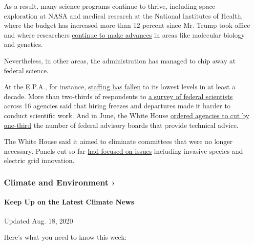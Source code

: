 As a result, many science programs continue to thrive, including space
exploration at NASA and medical research at the National Institutes of
Health, where the budget has increased more than 12 percent since Mr.
Trump took office and where researchers
\href{https://www.nytimes3xbfgragh.onion/2018/01/06/us/politics/congress-medical-research-health-care.html}{continue
to make advances} in areas like molecular biology and genetics.

Nevertheless, in other areas, the administration has managed to chip
away at federal science.

At the E.P.A., for instance,
\href{https://fas.org/sgp/crs/misc/IF11153.pdf}{staffing has fallen} to
its lowest levels in at least a decade. More than two-thirds of
respondents to
\href{https://www.ucsusa.org/sites/default/files/attach/2018/08/science-under-trump-report.pdf}{a
survey of federal scientists} across 16 agencies said that hiring
freezes and departures made it harder to conduct scientific work. And in
June, the White House
\href{https://www.whitehouse.gov/presidential-actions/executive-order-evaluating-improving-utility-federal-advisory-committees/}{ordered
agencies to cut by one-third} the number of federal advisory boards that
provide technical advice.

The White House said it aimed to eliminate committees that were no
longer necessary. Panels cut so far
\href{https://eos.org/articles/white-house-order-shutters-some-key-advisory-committees}{had
focused on issues} including invasive species and electric grid
innovation.

\href{https://www.nytimes3xbfgragh.onion/section/climate?action=click\&pgtype=Article\&state=default\&region=MAIN_CONTENT_1\&context=storylines_keepup}{}

\hypertarget{climate-and-environment-}{%
\subsubsection{Climate and Environment
›}\label{climate-and-environment-}}

\hypertarget{keep-up-on-the-latest-climate-news}{%
\paragraph{Keep Up on the Latest Climate
News}\label{keep-up-on-the-latest-climate-news}}

Updated Aug. 18, 2020

Here's what you need to know this week:

